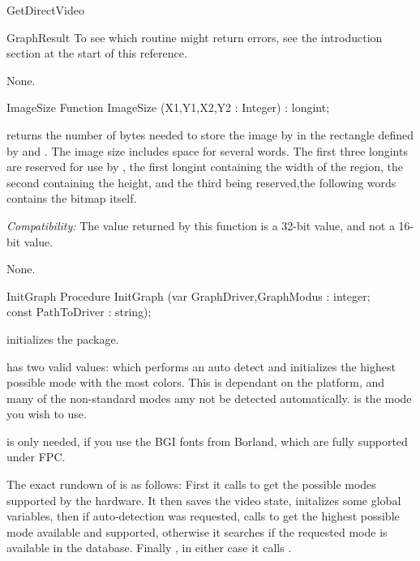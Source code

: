 \begin{function}{GetDirectVideo}
\begin{function}{GraphResult}
To see which routine might return errors, see the introduction section at
the start of this reference.

\Errors
None.
\SeeAlso
{}
\end{function}

\begin{function}{ImageSize}
\Declaration
Function ImageSize (X1,Y1,X2,Y2 : Integer) : longint;

\Description
{} returns the number of bytes needed to store the image
by  in the rectangle defined by  and .
The image size includes space for several words. The first three longints
are reserved for use by , the first longint containing the
width of the region, the second containing the height, and the third being
reserved,the following words contains the bitmap itself.

\textit{Compatibility:}
 The value returned by this function is a 32-bit value,
 and not a 16-bit value.

\Errors
None.
\SeeAlso
{}
\end{function}

\begin{procedure}{InitGraph}
\Declaration
Procedure InitGraph (var GraphDriver,GraphModus : integer;\\
const PathToDriver : string);

\Description

 initializes the  package.

 has two valid values:  which
performs an auto detect and initializes the highest possible mode with the most
colors. This is dependant on the platform, and many of the non-standard
modes amy not be detected automatically.  is the mode you
wish to use.

 is only needed, if you use the BGI fonts from
Borland, which are fully supported under FPC.

The exact rundown of  is as follows: First it calls
 to get the possible modes supported by the hardware.
It then saves the video state, initalizes some global variables, then if
auto-detection was requested, calls  to get the highest
possible mode available and supported, otherwise it searches if the requested
mode is available in the database. Finally , in either case it calls
.


\end{procedure}
\end{function}
